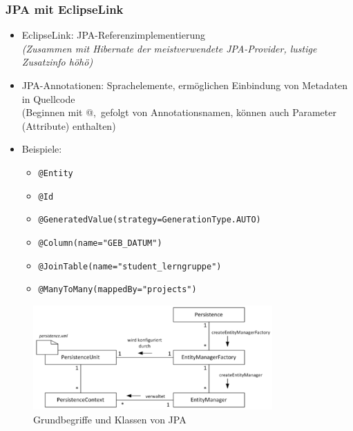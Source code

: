 \documentclass[a4paper]{article}
\begin{document}
			\newpage
			
			\subsubsection{JPA mit EclipseLink}
			
			\begin{itemize}
				\item EclipseLink: JPA-Referenzimplementierung\\
				\textit{(Zusammen mit Hibernate der meistverwendete JPA-Provider, lustige Zusatzinfo höhö)}
				\item JPA-Annotationen: Sprachelemente, ermöglichen Einbindung von Metadaten in Quellcode\\
				(Beginnen mit @, gefolgt von Annotationsnamen, können auch Parameter (Attribute) enthalten)
				\item Beispiele:
					\begin{itemize}
						\item \texttt{@Entity}
						\item \texttt{@Id}
						\item \texttt{@GeneratedValue(strategy=GenerationType.AUTO)}
						\item \texttt{@Column(name="GEB\_DATUM")}
						\item \texttt{@JoinTable(name="student\_lerngruppe")}
						\item \texttt{@ManyToMany(mappedBy="projects")}
					\end{itemize}
			\end{itemize}
		
			\begin{figure}[!htb]
				\centering
				\includegraphics[keepaspectratio, height=4cm]{img/persistence/grundbegriffe.png}
				\caption{Grundbegriffe und Klassen von JPA}
				\label{fig:jpa_base}
			\end{figure}
		
\end{document}
